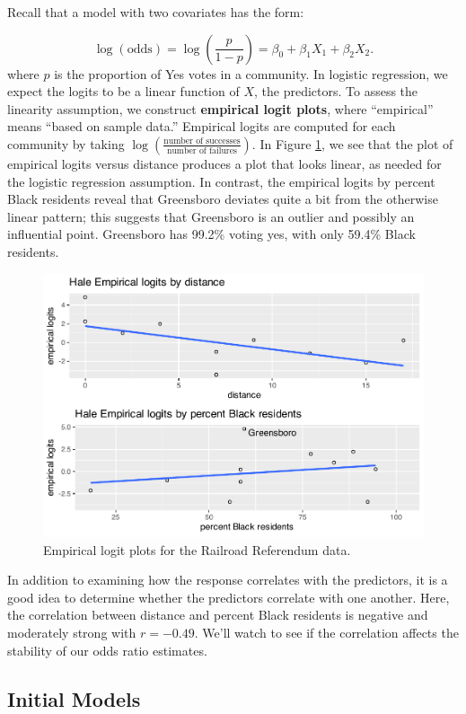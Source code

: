 \documentclass[
]{krantz}
\begin{document}
Recall that a model with two covariates has the form:

\[\log(\textrm{odds}) = \log\left(\frac{p}{1-p}\right) = \beta_0+\beta_1X_1+\beta_2X_2.\]
where \(p\) is the proportion of Yes votes in a community. In logistic regression, we expect the logits to be a linear function of \(X\), the predictors. To assess the linearity assumption, we construct \textbf{empirical logit plots},  where ``empirical'' means ``based on sample data.'' Empirical logits are computed for each community by taking \(\log\left(\frac{\textrm{number of successes}}{\textrm{number of failures}}\right)\). In Figure \ref{fig:emplogits}, we see that the plot of empirical logits versus distance produces a plot that looks linear, as needed for the logistic regression assumption. In contrast, the empirical logits by percent Black residents reveal that Greensboro deviates quite a bit from the otherwise linear pattern; this suggests that Greensboro is an outlier and possibly an influential point. Greensboro has 99.2\% voting yes, with only 59.4\% Black residents.

\begin{figure}

{\centering \includegraphics[width=0.6\linewidth]{bookdown-BeyondMLR_files/figure-latex/emplogits-1} 

}

\caption{Empirical logit plots for the Railroad Referendum data.}\label{fig:emplogits}
\end{figure}

In addition to examining how the response correlates with the predictors, it is a good idea to determine whether the predictors correlate with one another. Here, the correlation between distance and percent Black residents is negative and moderately strong with \(r = -0.49\). We'll watch to see if the correlation affects the stability of our odds ratio estimates.

\subsection{Initial Models}\label{initial-models-1}
\end{document}
